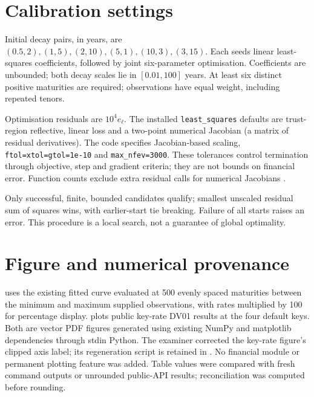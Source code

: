 \section{Calibration settings}\label{sec:reproduce-fit}
Initial decay pairs, in years, are \((0.5,2),(1,5),(2,10),(5,1),(10,3),(3,15)\).
Each seeds linear least-squares coefficients, followed by joint six-parameter optimisation. Coefficients are unbounded; both decay scales lie in \([0.01,100]\) years. At least six distinct positive maturities are required; observations have equal weight, including repeated tenors.

Optimisation residuals are \(10^4e_\ell\). The installed \texttt{least\_squares} defaults are trust-region reflective, linear loss and a two-point numerical Jacobian (a matrix of residual derivatives). The code specifies Jacobian-based scaling, \texttt{ftol=xtol=gtol=1e-10} and \texttt{max\_nfev=3000}. These tolerances control termination through objective, step and gradient criteria; they are not bounds on financial error. Function counts exclude extra residual calls for numerical Jacobians \parencite{scipyLeastSquares}.

Only successful, finite, bounded candidates qualify; smallest unscaled residual sum of squares wins, with earlier-start tie breaking. Failure of all starts raises an error. This procedure is a local search, not a guarantee of global optimality.

\section{Figure and numerical provenance}
 uses the existing fitted curve evaluated at 500 evenly spaced maturities between the minimum and maximum supplied observations, with rates multiplied by 100 for percentage display.  plots public key-rate DV01 results at the four default keys. Both are vector PDF figures generated using existing NumPy and matplotlib dependencies through stdin Python. The examiner corrected the key-rate figure's clipped axis label; its regeneration script is retained in . No financial module or permanent plotting feature was added. Table values were compared with fresh command outputs or unrounded public-API results; reconciliation was computed before rounding.

